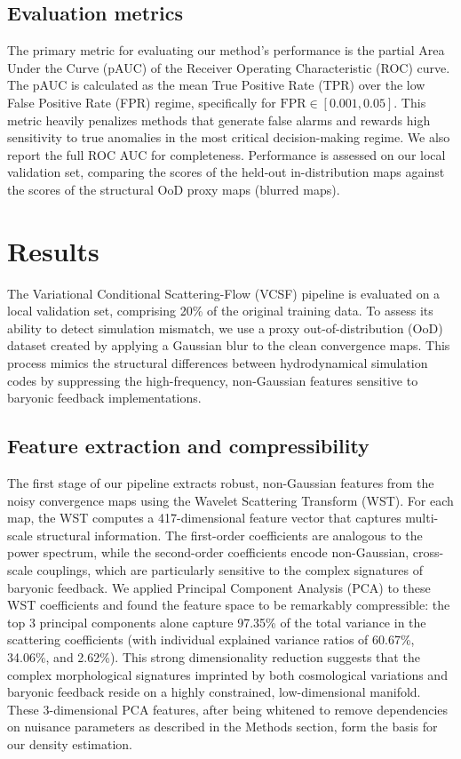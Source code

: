 \documentclass[]{article}
\begin{document}
\subsection{Evaluation metrics}
The primary metric for evaluating our method's performance is the partial Area Under the Curve (pAUC) of the Receiver Operating Characteristic (ROC) curve. The pAUC is calculated as the mean True Positive Rate (TPR) over the low False Positive Rate (FPR) regime, specifically for $\text{FPR} \in [0.001, 0.05]$. This metric heavily penalizes methods that generate false alarms and rewards high sensitivity to true anomalies in the most critical decision-making regime. We also report the full ROC AUC for completeness. Performance is assessed on our local validation set, comparing the scores of the held-out in-distribution maps against the scores of the structural OoD proxy maps (blurred maps).

\section{Results}
\label{sec:results}
The Variational Conditional Scattering-Flow (VCSF) pipeline is evaluated on a local validation set, comprising 20\% of the original training data. To assess its ability to detect simulation mismatch, we use a proxy out-of-distribution (OoD) dataset created by applying a Gaussian blur to the clean convergence maps. This process mimics the structural differences between hydrodynamical simulation codes by suppressing the high-frequency, non-Gaussian features sensitive to baryonic feedback implementations.

\subsection{Feature extraction and compressibility}
The first stage of our pipeline extracts robust, non-Gaussian features from the noisy convergence maps using the Wavelet Scattering Transform (WST). For each map, the WST computes a 417-dimensional feature vector that captures multi-scale structural information. The first-order coefficients are analogous to the power spectrum, while the second-order coefficients encode non-Gaussian, cross-scale couplings, which are particularly sensitive to the complex signatures of baryonic feedback. We applied Principal Component Analysis (PCA) to these WST coefficients and found the feature space to be remarkably compressible: the top 3 principal components alone capture 97.35\% of the total variance in the scattering coefficients (with individual explained variance ratios of 60.67\%, 34.06\%, and 2.62\%). This strong dimensionality reduction suggests that the complex morphological signatures imprinted by both cosmological variations and baryonic feedback reside on a highly constrained, low-dimensional manifold. These 3-dimensional PCA features, after being whitened to remove dependencies on nuisance parameters as described in the Methods section, form the basis for our density estimation.
\end{document}
